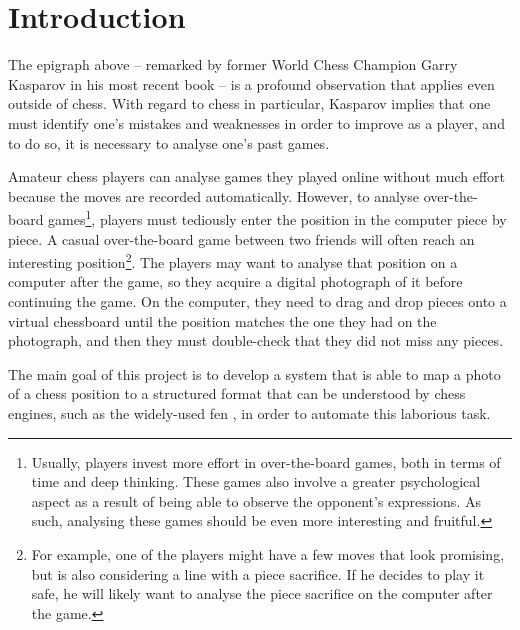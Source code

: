 \documentclass[../report.tex]{subfiles}
\begin{document}
\chapter{Introduction}
\label{chap:introduction}

The epigraph above -- remarked by former World Chess Champion Garry Kasparov in his most recent book \cite{kasparov2018} -- is a profound observation that applies even outside of chess.
With regard to chess in particular, Kasparov implies that one must identify one's mistakes and weaknesses in order to improve as a player, and to do so, it is necessary to analyse one's past games. 

Amateur chess players can analyse games they played online without much effort because the moves are recorded automatically.
However, to analyse over-the-board games\footnote{Usually, players invest more effort in over-the-board games, both in terms of time and deep thinking. These games also involve a greater psychological aspect as a result of being able to observe the opponent's expressions. As such, analysing these games should be even more interesting and fruitful.}, players must tediously enter the position in the computer piece by piece.
A casual over-the-board game between two friends will often reach an interesting position\footnote{For example, one of the players might have a few moves that look promising, but is also considering a line with a piece sacrifice. If he decides to play it safe, he will likely want to analyse the piece sacrifice on the computer after the game.}. 
The players may want to analyse that position on a computer after the game, so they acquire a digital photograph of it before continuing the game.
On the computer, they need to drag and drop pieces onto a virtual chessboard until the position matches the one they had on the photograph, and then they must double-check that they did not miss any pieces.

The main goal of this project is to develop a system that is able to map a photo of a chess position to a structured format that can be understood by chess engines, such as the widely-used \gls{fen} \cite{edwards1994}, in order to automate this laborious task.






\end{document}
